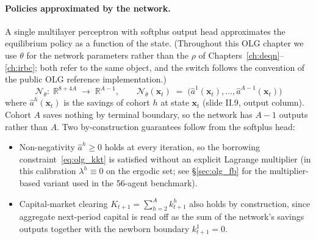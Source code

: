 \documentclass[11pt,a4paper]{report}
\newcommand{\x}{\bm{x}}
\newcommand{\R}{\mathbb{R}}
\begin{document}
\paragraph{Policies approximated by the network.}
A single multilayer perceptron with softplus output head approximates the equilibrium policy as a function of the state.  (Throughout this OLG chapter we use $\theta$ for the network parameters rather than the $\rho$ of Chapters~\ref{ch:deqn}--\ref{ch:irbc}; both refer to the same object, and the switch follows the convention of the public OLG reference implementation.)
\begin{equation}
\boxed{\;\mathcal{N}_\theta:\;\R^{8+4A} \;\longrightarrow\; \R^{A-1},\qquad
\mathcal{N}_\theta(\x_t) \;=\; \bigl(\hat a^1(\x_t),\ldots,\hat a^{A-1}(\x_t)\bigr)\;}
\label{eq:olg_policy}
\end{equation}
where $\hat a^h(\x_t)$ is the savings of cohort $h$ at state $\x_t$ (slide II.9, output column).  Cohort $A$ saves nothing by terminal boundary, so the network has $A-1$ outputs rather than $A$.  Two by-construction guarantees follow from the softplus head:
\begin{itemize}[itemsep=2pt]
    \item Non-negativity $\hat a^h \ge 0$ holds at every iteration, so the borrowing constraint~\eqref{eq:olg_kkt} is satisfied without an explicit Lagrange multiplier (in this calibration $\lambda^h \equiv 0$ on the ergodic set; see \S\ref{sec:olg_fb} for the multiplier-based variant used in the 56-agent benchmark).
    \item Capital-market clearing $K_{t+1} = \sum_{h=2}^{A} k_{t+1}^h$ also holds by construction, since aggregate next-period capital is read off as the sum of the network's savings outputs together with the newborn boundary $k_{t+1}^1 = 0$.
\end{itemize}
\end{document}
